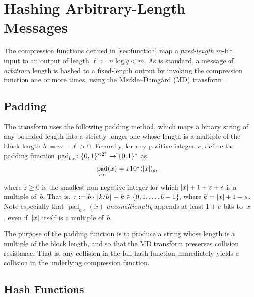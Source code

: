 \documentclass[11pt]{article}
\DeclarePairedDelimiter\inner{\langle}{\rangle}
\DeclarePairedDelimiter\abs{\lvert}{\rvert}
\DeclarePairedDelimiter\set{\{}{\}}
\DeclarePairedDelimiter\ceil{\lceil}{\rceil}
\numberwithin{equation}{section}
\newcommand{\bit}{\ensuremath{\set{0,1}}}
\DeclareMathOperator{\pad}{pad}
\begin{document}



\section{Hashing Arbitrary-Length Messages}
\label{sec:arbitrary}

The compression functions defined in \cref{sec:function} map a
\emph{fixed-length} $m$-bit input to an output of length
$\ell := n \log q < m$. As is standard, a message of \emph{arbitrary}
length is hashed to a fixed-length output by invoking the compression
function one or more times, using the Merkle--Damg{\aa}rd (MD)
transform~\cite{DBLP:conf/crypto/Merkle89,DBLP:conf/crypto/Damgard89a}.

\subsection{Padding}
\label{sec:padding}

The transform uses the following padding method, which maps a binary
string of any bounded length into a strictly longer one whose length
is a multiple of the block length $b := m - \ell > 0$. Formally, for
any positive integer~$e$, define the padding function
$\pad_{b,e} \colon \bit^{< 2^{e}} \to \bit^{*}$ as
\begin{equation}
  \label{eq:pad}
  \pad_{b,e}(x) = x 1 0^{z} \inner{\abs{x}}_{e} \text{,}
\end{equation}
where $z \geq 0$ is the smallest non-negative integer for which
$\abs{x}+1+z+e$ is a multiple of~$b$. That is,
$r := b \cdot \ceil{k/b} - k \in \set{0, 1, \ldots, b-1}$, where
$k=\abs{x}+1+e$. Note especially that $\pad_{b,e}(x)$
\emph{unconditionally} appends at least $1+e$ bits to~$x$, even
if~$\abs{x}$ itself is a multiple of~$b$.

The purpose of the padding function is to produce a string whose
length is a multiple of the block length, and so that the MD transform
preserves collision resistance. That is, any collision in the full
hash function immediately yields a collision in the underlying
compression function.

\subsection{Hash Functions}
\label{sec:hash-functions}
\end{document}
